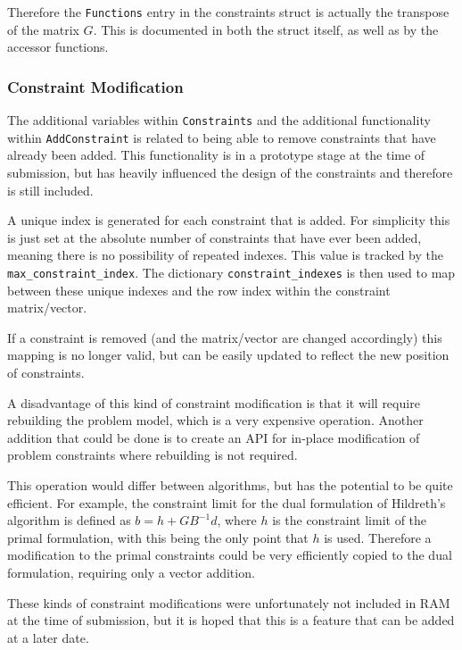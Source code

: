 Therefore the \texttt{Functions} entry in the constraints struct is actually the transpose of the matrix $G$. This is documented in both the struct itself, as well as by the accessor functions.

\subsubsection{Constraint Modification}

The additional variables within \texttt{Constraints} and the additional functionality within \texttt{AddConstraint} is related to being able to remove constraints that have already been added. This functionality is in a prototype stage at the time of submission, but has heavily influenced the design of the constraints and therefore is still included. 

A unique index is generated for each constraint that is added. For simplicity this is just set at the absolute number of constraints that have ever been added, meaning there is no possibility of repeated indexes. This value is tracked by the \texttt{max\_constraint\_index}. The dictionary \texttt{constraint\_indexes} is then used to map between these unique indexes and the row index within the constraint matrix/vector. 

If a constraint is removed (and the matrix/vector are changed accordingly) this mapping is no longer valid, but can be easily updated to reflect the new position of constraints.

A disadvantage of this kind of constraint modification is that it will require rebuilding the problem model, which is a very expensive operation. Another addition that could be done is to create an API for in-place modification of problem constraints where rebuilding is not required.

This operation would differ between algorithms, but has the potential to be quite efficient. For example, the constraint limit for the dual formulation of Hildreth's algorithm is defined as $b=h+GB^{-1}d$, where $h$ is the constraint limit of the primal formulation, with this being the only point that $h$ is used. Therefore a modification to the primal constraints could be very efficiently copied to the dual formulation, requiring only a vector addition. 

These kinds of constraint modifications were unfortunately not included in RAM at the time of submission, but it is hoped that this is a feature that can be added at a later date.

